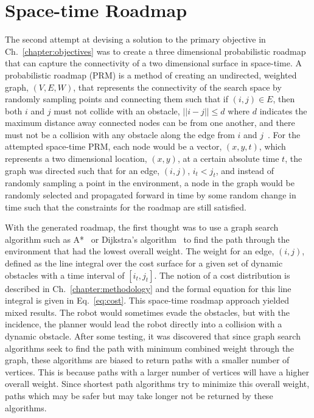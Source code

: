 \section{Space-time Roadmap}

\label{sec:stroadmap}

The second attempt at devising a solution to the primary objective in
Ch.~\ref{chapter:objectives} was to create a three dimensional probabilistic
roadmap that can capture the connectivity of a two dimensional surface in
space-time. A probabilistic roadmap (PRM) is a method of creating an
undirected, weighted graph, $(V, E, W)$, that represents the connectivity of
the search space by randomly sampling points and connecting them such that if
$(i, j) \in E$, then both $i$ and $j$ must not collide with an obstacle, $||i -
j|| \leq d$ where $d$ indicates the maximum distance away connected nodes can
be from one another, and there must not be a collision with any obstacle along
the edge from $i$ and $j$~\cite{prm}. For the attempted space-time PRM, each
node would be a vector, $(x, y, t)$, which represents a two dimensional
location, $(x, y)$, at a certain absolute time $t$, the graph was directed such
that for an edge, $(i, j)$, $i_t < j_t$, and instead of randomly sampling a
point in the environment, a node in the graph would be randomly selected and
propagated forward in time by some random change in time such that the
constraints for the roadmap are still satisfied.


With the generated roadmap, the first thought was to use a graph search
algorithm such as A*~\cite{astar} or Dijkstra's algorithm~\cite{dijkstra} to
find the path through the environment that had the lowest overall weight.  The
weight for an edge, $(i, j)$, defined as the line integral over the cost
surface for a given set of dynamic obstacles with a time interval of $[i_t,
j_t]$.  The notion of a cost distribution is described in
Ch.~\ref{chapter:methodology} and the formal equation for this line integral is
given in Eq.~\ref{eq:cost}.  This space-time roadmap approach yielded mixed
results.  The robot would sometimes evade the obstacles, but with the
incidence, the planner would lead the robot directly into a collision with a
dynamic obstacle. After some testing, it was discovered that since graph search
algorithms seek to find the path with minimum combined weight through the
graph, these algorithms are biased to return paths with a smaller number of
vertices.  This is because paths with a larger number of vertices will have a
higher overall weight. Since shortest path algorithms try to minimize this
overall weight, paths which may be safer but may take longer not be returned by
these algorithms.

